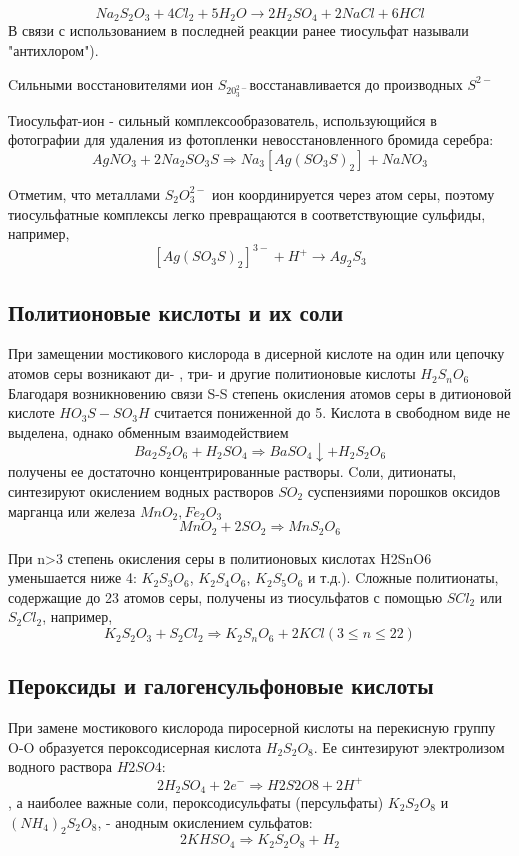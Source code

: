 \documentclass[11pt]{article}
\begin{document}
$$Na_{2}S_{2}O_{3}+4Cl_{2}+5H_{2}O\rightarrow 2H_{2}SO_{4}+2NaCl+6HCl$$
В связи с использованием в последней реакции ранее тиосульфат называли "антихлором").

Cильными восстановителями ион $S_20_3^{2-}$восстанавливается до производных $S^{2-}$

Тиосульфат-ион - сильный комплексообразователь, использующийся в фотографии для удаления из
фотопленки невосстановленного бромида серебра:
$$AgNO_3 + 2Na_2SO_3S \Rightarrow Na_3[Ag(SO_3S)_2] + NaNO_3$$

Oтметим, что металлами $S_2O_3^{2-}$ ион координируется через атом серы, поэтому тиосульфатные комплексы
легко превращаются в соответствующие сульфиды, например,
$$[Ag(SO_3S)_2]^{3-} + H^+ \rightarrow Ag_2S_3$$

\subsection{Политионовые кислоты и их соли}

При замещении мостикового кислорода в дисерной кислоте на один или цепочку атомов серы возникают ди-
, три- и другие политионовые кислоты $H_2S_nO_6$
Благодаря возникновению связи S-S степень окисления атомов серы в дитионовой кислоте $HO_3S-SO_3H$ считается пониженной до 5. Кислота в свободном виде не выделена, однако обменным взаимодействием
$$Ba_2S_2O_6 + H_2SO_4 \Rightarrow BaSO_4 \downarrow + H_2S_2O_6$$
получены ее достаточно концентрированные растворы. Cоли, дитионаты, синтезируют окислением водных
растворов $SO_2$ суспензиями порошков оксидов марганца или железа $MnO_2, Fe_2O_3$
$$MnO_2 + 2SO_2 \Rightarrow MnS_2O_6$$

При n>3 степень окисления серы в политионовых кислотах H2SnO6 уменьшается ниже 4: $K_2S_3O_6$,  $K_2S_4O_6$,
$K_2S_5O_6$ и т.д.). Cложные политионаты, содержащие до 23 атомов серы, получены из тиосульфатов с помощью
$SCl_2$ или $S_2Cl_2$, например,
$$K_2S_2O_3 + S_2Cl_2 \Rightarrow K_2S_nO_6 + 2KCl(3 \le n \le 22)$$

\subsection{Пероксиды и галогенсульфоновые кислоты}

При замене мостикового кислорода пиросерной кислоты на перекисную группу O-O
образуется пероксодисерная кислота $H_2S_2O_8$. Ее синтезируют электролизом водного раствора $H2SO4$:
$$2 H_2SO_4 + 2 e^- \Rightarrow H2S2O8 + 2H^+$$
, а наиболее важные соли, пероксодисульфаты (персульфаты) $K_2S_2O_8$ и
$(NH_4)_2S_2O_8$, - анодным окислением сульфатов: $$2KHSO_4 \Rightarrow K_2S_2O_8 + H_2$$
\end{document}
